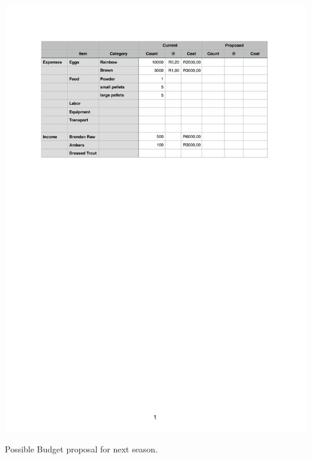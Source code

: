 \begin{table}[H]
  \centering
  \includegraphics[scale = 0.9]{tables/TablesBudget.pdf}
   \caption{Possible Budget proposal for next season.}
  \label{tab:Budget}
\end{table}
 


